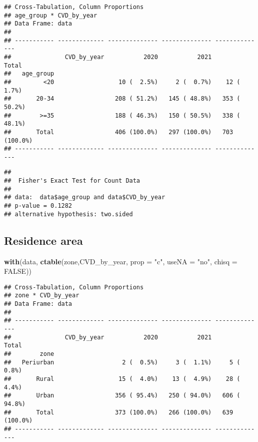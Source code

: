 \documentclass[
]{article}
\newenvironment{Shaded}{\begin{snugshade}}{\end{snugshade}}
\newcommand{\AttributeTok}[1]{\textcolor[rgb]{0.13,0.29,0.53}{#1}}
\newcommand{\ConstantTok}[1]{\textcolor[rgb]{0.56,0.35,0.01}{#1}}
\newcommand{\FunctionTok}[1]{\textcolor[rgb]{0.13,0.29,0.53}{\textbf{#1}}}
\newcommand{\NormalTok}[1]{#1}
\newcommand{\SpecialCharTok}[1]{\textcolor[rgb]{0.81,0.36,0.00}{\textbf{#1}}}
\newcommand{\StringTok}[1]{\textcolor[rgb]{0.31,0.60,0.02}{#1}}
\begin{document}
\begin{verbatim}
## Cross-Tabulation, Column Proportions  
## age_group * CVD_by_year  
## Data Frame: data  
## 
## ----------- ------------- -------------- -------------- --------------
##               CVD_by_year           2020           2021          Total
##   age_group                                                           
##         <20                  10 (  2.5%)     2 (  0.7%)    12 (  1.7%)
##       20-34                 208 ( 51.2%)   145 ( 48.8%)   353 ( 50.2%)
##        >=35                 188 ( 46.3%)   150 ( 50.5%)   338 ( 48.1%)
##       Total                 406 (100.0%)   297 (100.0%)   703 (100.0%)
## ----------- ------------- -------------- -------------- --------------
\end{verbatim}

\begin{Shaded}
\end{Shaded}

\begin{verbatim}
## 
##  Fisher's Exact Test for Count Data
## 
## data:  data$age_group and data$CVD_by_year
## p-value = 0.1282
## alternative hypothesis: two.sided
\end{verbatim}

\hypertarget{residence-area}{%
\subsection{Residence area}\label{residence-area}}

\begin{Shaded}
\begin{Highlighting}[]
\FunctionTok{with}\NormalTok{(data, }\FunctionTok{ctable}\NormalTok{(zone,CVD\_by\_year, }\AttributeTok{prop =} \StringTok{"c"}\NormalTok{, }\AttributeTok{useNA =} \StringTok{"no"}\NormalTok{, }\AttributeTok{chisq =} \ConstantTok{FALSE}\NormalTok{))}
\end{Highlighting}
\end{Shaded}

\begin{verbatim}
## Cross-Tabulation, Column Proportions  
## zone * CVD_by_year  
## Data Frame: data  
## 
## ----------- ------------- -------------- -------------- --------------
##               CVD_by_year           2020           2021          Total
##        zone                                                           
##   Periurban                   2 (  0.5%)     3 (  1.1%)     5 (  0.8%)
##       Rural                  15 (  4.0%)    13 (  4.9%)    28 (  4.4%)
##       Urban                 356 ( 95.4%)   250 ( 94.0%)   606 ( 94.8%)
##       Total                 373 (100.0%)   266 (100.0%)   639 (100.0%)
## ----------- ------------- -------------- -------------- --------------
\end{verbatim}
\end{document}
